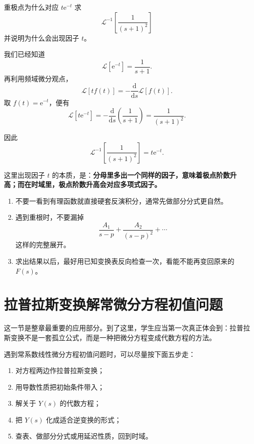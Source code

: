 \begin{lizi}{重极点为什么对应 $t\mathrm{e}^{-t}$}{}
求
\[
    \mathcal{L}^{-1}\left[\frac{1}{(s+1)^2}\right]
\]
并说明为什么会出现因子 $t$。

\begin{jie}
我们已经知道
\[
    \mathcal{L}[\mathrm{e}^{-t}]
    =
    \frac{1}{s+1}.
\]
再利用频域微分观点，
\[
    \mathcal{L}[t f(t)]
    =
    -\frac{\mathrm{d}}{\mathrm{d}s}\mathcal{L}[f(t)].
\]
取 $f(t)=\mathrm{e}^{-t}$，便有
\[
    \mathcal{L}[t\mathrm{e}^{-t}]
    =
    -\frac{\mathrm{d}}{\mathrm{d}s}\left(\frac{1}{s+1}\right)
    =
    \frac{1}{(s+1)^2}.
\]

因此
\[
    \mathcal{L}^{-1}\left[\frac{1}{(s+1)^2}\right]
    =
    t\mathrm{e}^{-t}.
\]

这里出现因子 $t$ 的本质，是：\textbf{分母里多出一个同样的因子，意味着极点阶数升高；而在时域里，极点阶数升高会对应多项式因子。}
\end{jie}
\end{lizi}

\begin{jinshi}[逆变换时最常见的错误]
\begin{enumerate}
    \item 不要一看到有理函数就直接硬套反演积分，通常先做部分分式更自然。
    \item 遇到重根时，不要漏掉
    \[
        \frac{A_1}{s-p}+\frac{A_2}{(s-p)^2}+\cdots
    \]
这样的完整展开。
    \item 求出结果以后，最好用已知变换表反向检查一次，看能不能再变回原来的 $F(s)$。
\end{enumerate}
\end{jinshi}

\section{拉普拉斯变换解常微分方程初值问题}

这一节是整章最重要的应用部分。到了这里，学生应当第一次真正体会到：拉普拉斯变换不是一套孤立公式，而是一种把微分方程变成代数方程的方法。

\begin{tishi}[求解初值问题的标准流程]
遇到常系数线性微分方程初值问题时，可以尽量按下面五步走：
\begin{enumerate}
    \item 对方程两边作拉普拉斯变换；
    \item 用导数性质把初始条件带入；
    \item 解关于 $Y(s)$ 的代数方程；
    \item 把 $Y(s)$ 化成适合逆变换的形式；
    \item 查表、做部分分式或用延迟性质，回到时域。
\end{enumerate}
\end{tishi}

